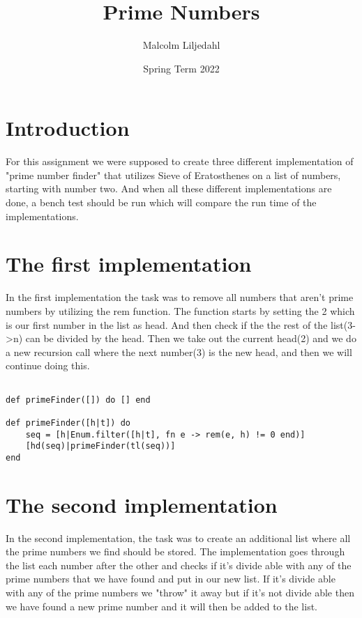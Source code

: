 \documentclass[a4paper,11pt]{article}
\begin{document}
\title{
    \textbf{Prime Numbers}
}
\author{Malcolm Liljedahl}
\date{Spring Term 2022}

\maketitle

\section*{Introduction}
For this assignment we were supposed to create three different implementation of "prime number finder" that utilizes Sieve of Eratosthenes on a list of numbers, starting with number two. And when all these different implementations are done, a bench test should be run which will compare the run time of the implementations. 

\section{The first implementation}
In the first implementation the task was to remove all numbers that aren't prime numbers by utilizing the rem function. The function starts by setting the 2 which is our first number in the list as head. And then check if the the rest of the list(3->n) can be divided by the head. Then we take out the current head(2) and we do a new recursion call where the next number(3) is the new head, and then we will continue doing this.

\begin{verbatim}

def primeFinder([]) do [] end
    
def primeFinder([h|t]) do
    seq = [h|Enum.filter([h|t], fn e -> rem(e, h) != 0 end)]
    [hd(seq)|primeFinder(tl(seq))]
end

\end{verbatim}


\section{The second implementation}
In the second implementation, the task was to create an additional list where all the prime numbers we find should be stored. The implementation goes through the list each number after the other and checks if it's divide able with any of the prime numbers that we have found and put in our new list. If it's divide able with any of the prime numbers we "throw" it away but if it's not divide able then we have found a new prime number and it will then be added to the list.
\end{document}
